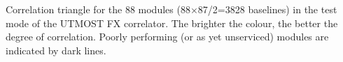 Correlation triangle for the 88 modules (88$\times$87/2=3828 baselines) in the test mode of the UTMOST FX correlator. The brighter the colour, the better the degree of correlation. Poorly performing (or as yet unserviced) modules are indicated by dark lines.
  
  